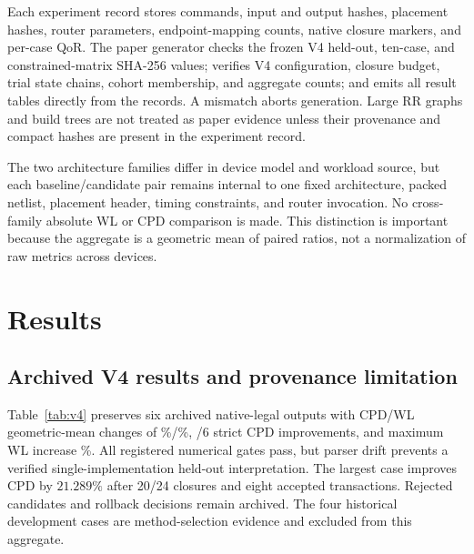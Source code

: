 \documentclass[sigconf,anonymous,review]{acmart}
\begin{document}
Each experiment record stores commands, input and output hashes, placement
hashes, router parameters, endpoint-mapping counts, native closure markers,
and per-case QoR.  The paper generator checks the frozen V4 held-out,
ten-case, and constrained-matrix SHA-256 values; verifies V4 configuration,
closure budget, trial state chains, cohort membership, and aggregate counts;
and emits all result tables directly from the records.  A mismatch aborts
generation.  Large RR graphs and build trees
are not treated as paper evidence unless their provenance and compact hashes
are present in the experiment record.

The two architecture families differ in device model and workload source, but
each baseline/candidate pair remains internal to one fixed architecture,
packed netlist, placement header, timing constraints, and router invocation.
No cross-family absolute WL or CPD comparison is made.  This distinction is
important because the aggregate is a geometric mean of paired ratios, not a
normalization of raw metrics across devices.

\section{Results}

\subsection{Archived V4 results and provenance limitation}

\begin{table}[t]
\centering
\small
\caption{Archived V4 routed QoR; parser provenance is not uniform.  CPD is in ns.  ``Closures''
counts every native route-and-analysis oracle call; ``Accepts'' counts atomic
transactions committed after native acceptance.}
\label{tab:v4}

\end{table}

Table~\ref{tab:v4} preserves six archived native-legal outputs with
CPD/WL geometric-mean changes of \VFourCpdGeo\%/\VFourWlGeo\%,
\VFourStrict/6 strict CPD improvements, and maximum WL increase
\VFourWorstWl\%. All registered numerical gates pass, but parser drift
prevents a verified single-implementation held-out interpretation.
The largest case improves CPD by $21.289\%$ after 20/24 closures and eight
accepted transactions. Rejected candidates and rollback decisions remain
archived. The four historical development cases are method-selection evidence
and excluded from this aggregate.
\end{document}
